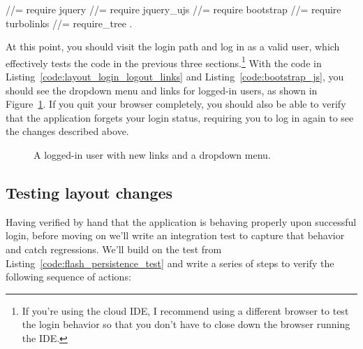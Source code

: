\begin{codelisting}
\label{code:bootstrap_js}
\begin{code}
//= require jquery
//= require jquery_ujs
//= require bootstrap
//= require turbolinks
//= require_tree .
\end{code}
\end{codelisting}


At this point, you should visit the login path and log in as a valid user, which effectively tests the code in the previous three sections.\footnote{If you're using the cloud IDE, I recommend using a different browser to test the login behavior so that you don't have to close down the browser running the IDE.} With the code in Listing~\ref{code:layout_login_logout_links} and Listing~\ref{code:bootstrap_js}, you should see the dropdown menu and links for logged-in users, as shown in Figure~\ref{fig:profile_with_logout_link}. If you quit your browser completely, you should also be able to verify that the application forgets your login status, requiring you to log in again to see the changes described above.

\begin{figure}
\begin{center}
\end{center}
\caption{A logged-in user with new links and a dropdown menu.\label{fig:profile_with_logout_link}}
\end{figure}


    \subsection{Testing layout changes} %
    \label{sec:testing_layout_changes}

Having verified by hand that the application is behaving properly upon successful login, before moving on we'll write an integration test to capture that behavior and catch regressions. We'll build on the test from Listing~\ref{code:flash_persistence_test} and write a series of steps to verify the following sequence of actions:

